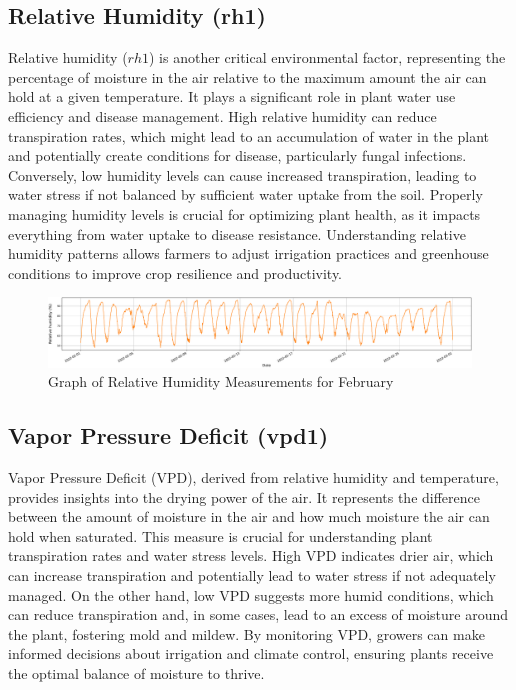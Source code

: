 \subsection{Relative Humidity (rh1)}

Relative humidity (\( rh1 \)) is another critical environmental factor, representing the percentage of moisture in the air relative to the maximum amount the air can hold at a given temperature. It plays a significant role in plant water use efficiency and disease management. High relative humidity can reduce transpiration rates, which might lead to an accumulation of water in the plant and potentially create conditions for disease, particularly fungal infections. Conversely, low humidity levels can cause increased transpiration, leading to water stress if not balanced by sufficient water uptake from the soil. Properly managing humidity levels is crucial for optimizing plant health, as it impacts everything from water uptake to disease resistance. Understanding relative humidity patterns allows farmers to adjust irrigation practices and greenhouse conditions to improve crop resilience and productivity.

\begin{figure}[htbp]
    \centering
    \includegraphics[width=15 cm]{4_ChapterMaterials/figuras/train_data_Relative_humidity.pdf}
    \caption{Graph of Relative Humidity Measurements for February}
    \end{figure}

\subsection{Vapor Pressure Deficit (vpd1)}

Vapor Pressure Deficit (VPD), derived from relative humidity and temperature, provides insights into the drying power of the air. It represents the difference between the amount of moisture in the air and how much moisture the air can hold when saturated. This measure is crucial for understanding plant transpiration rates and water stress levels. High VPD indicates drier air, which can increase transpiration and potentially lead to water stress if not adequately managed. On the other hand, low VPD suggests more humid conditions, which can reduce transpiration and, in some cases, lead to an excess of moisture around the plant, fostering mold and mildew. By monitoring VPD, growers can make informed decisions about irrigation and climate control, ensuring plants receive the optimal balance of moisture to thrive.

